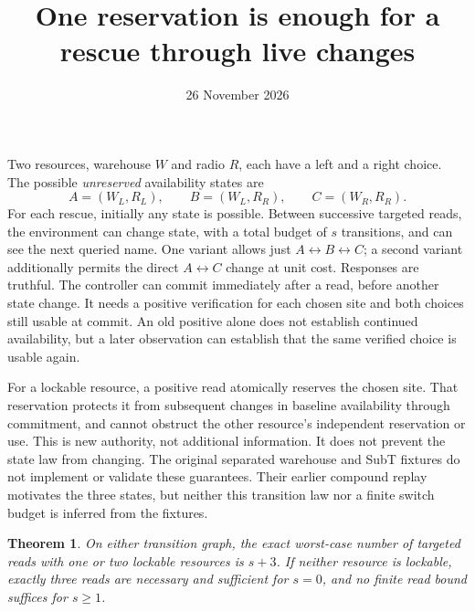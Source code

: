 \documentclass[11pt]{article}
\title{One reservation is enough for a rescue through live changes}
\author{}
\date{26 November 2026}
\newtheorem{theorem}{Theorem}
\begin{document}
\maketitle

Two resources, warehouse $W$ and radio $R$, each have a left and a right choice. The possible \emph{unreserved} availability states are
\[
 A=(W_L,R_L),\qquad B=(W_L,R_R),\qquad C=(W_R,R_R).
\]
For each rescue, initially any state is possible. Between successive targeted reads, the environment can change state, with a total budget of $s$ transitions, and can see the next queried name. One variant allows just $A\leftrightarrow B\leftrightarrow C$; a second variant additionally permits the direct $A\leftrightarrow C$ change at unit cost. Responses are truthful. The controller can commit immediately after a read, before another state change. It needs a positive verification for each chosen site and both choices still usable at commit. An old positive alone does not establish continued availability, but a later observation can establish that the same verified choice is usable again.

For a lockable resource, a positive read atomically reserves the chosen site. That reservation protects it from subsequent changes in baseline availability through commitment, and cannot obstruct the other resource's independent reservation or use. This is new authority, not additional information. It does not prevent the state law from changing. The original separated warehouse and SubT fixtures do not implement or validate these guarantees. Their earlier compound replay motivates the three states, but neither this transition law nor a finite switch budget is inferred from the fixtures.

\begin{theorem}
On either transition graph, the exact worst-case number of targeted reads with one or two lockable resources is $s+3$. If neither resource is lockable, exactly three reads are necessary and sufficient for $s=0$, and no finite read bound suffices for $s\ge1$.
\end{theorem}
\end{document}
